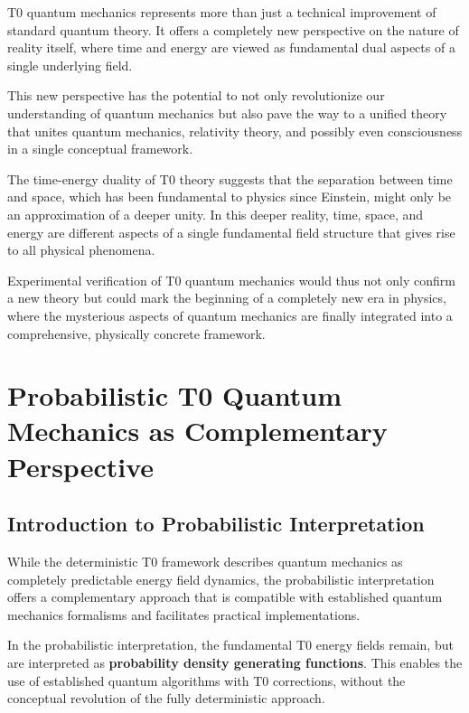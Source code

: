\documentclass[12pt,a4paper]{article}
\theoremstyle{definition}
\theoremstyle{remark}
\begin{document}
T0 quantum mechanics represents more than just a technical improvement of standard quantum theory. It offers a completely new perspective on the nature of reality itself, where time and energy are viewed as fundamental dual aspects of a single underlying field.

This new perspective has the potential to not only revolutionize our understanding of quantum mechanics but also pave the way to a unified theory that unites quantum mechanics, relativity theory, and possibly even consciousness in a single conceptual framework.

The time-energy duality of T0 theory suggests that the separation between time and space, which has been fundamental to physics since Einstein, might only be an approximation of a deeper unity. In this deeper reality, time, space, and energy are different aspects of a single fundamental field structure that gives rise to all physical phenomena.

Experimental verification of T0 quantum mechanics would thus not only confirm a new theory but could mark the beginning of a completely new era in physics, where the mysterious aspects of quantum mechanics are finally integrated into a comprehensive, physically concrete framework.
\section{Probabilistic T0 Quantum Mechanics as Complementary Perspective}

\subsection{Introduction to Probabilistic Interpretation}

While the deterministic T0 framework describes quantum mechanics as completely predictable energy field dynamics, the probabilistic interpretation offers a complementary approach that is compatible with established quantum mechanics formalisms and facilitates practical implementations.

\begin{tcolorbox}[colback=orange!5!white,colframe=orange!75!black,title=Probabilistic T0 Perspective]
	In the probabilistic interpretation, the fundamental T0 energy fields remain, but are interpreted as \textbf{probability density generating functions}. This enables the use of established quantum algorithms with T0 corrections, without the conceptual revolution of the fully deterministic approach.
\end{tcolorbox}
\end{document}
